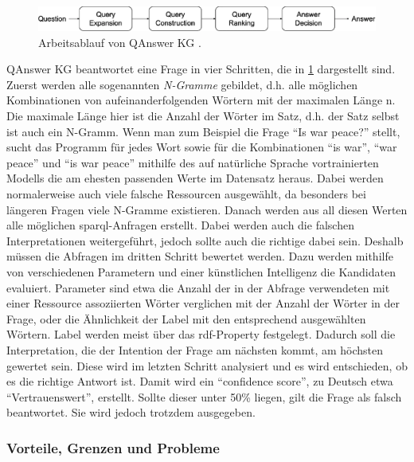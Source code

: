\begin{figure}%
\centering
\includegraphics[width=\textwidth, height=\textheight, keepaspectratio]{Images/QAnswerWorkflow.png}
\caption[QAnswer KG Arbeitsablauf]{Arbeitsablauf von QAnswer KG \citep{qanswer}.}
\label{fig:qanswerworkflow}
\end{figure}

QAnswer KG beantwortet eine Frage in vier Schritten, die in \cref{fig:qanswerworkflow} dargestellt sind.
Zuerst werden alle sogenannten \emph{N-Gramme} gebildet, d.h. alle möglichen Kombinationen von aufeinanderfolgenden Wörtern mit der maximalen Länge n.
Die maximale Länge hier ist die Anzahl der Wörter im Satz, d.h. der Satz selbst ist auch ein N-Gramm.
Wenn man zum Beispiel die Frage \enquote{Is war peace?} stellt,
sucht das Programm für jedes Wort sowie für die Kombinationen \enquote{is war}, \enquote{war peace} und \enquote{is war peace}
mithilfe des auf natürliche Sprache vortrainierten Modells die am ehesten passenden Werte im Datensatz heraus.
Dabei werden normalerweise auch viele falsche Ressourcen ausgewählt, da besonders bei längeren Fragen viele N-Gramme existieren.
Danach werden aus all diesen Werten alle möglichen \ac{sparql}-Anfragen erstellt.
Dabei werden auch die falschen Interpretationen weitergeführt, jedoch sollte auch die richtige dabei sein.
Deshalb müssen die Abfragen im dritten Schritt bewertet werden.
Dazu werden mithilfe von verschiedenen Parametern und einer künstlichen Intelligenz die Kandidaten evaluiert.
Parameter sind etwa die Anzahl der in der Abfrage verwendeten mit einer Ressource assoziierten Wörter verglichen mit der Anzahl der Wörter in der Frage,
oder die Ähnlichkeit der Label mit den entsprechend ausgewählten Wörtern.
Label werden meist über das \ac{rdf}-Property  festgelegt.
Dadurch soll die Interpretation, die der Intention der Frage am nächsten kommt, am höchsten gewertet sein.
Diese wird im letzten Schritt analysiert und es wird entschieden, ob es die richtige Antwort ist.
Damit wird ein \enquote{confidence score}, zu Deutsch etwa \enquote{Vertrauenswert}, erstellt.
Sollte dieser unter 50\% liegen, gilt die Frage als falsch beantwortet.
Sie wird jedoch trotzdem ausgegeben.

\subsubsection{Vorteile, Grenzen und Probleme}

